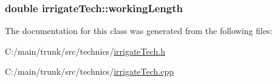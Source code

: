 \label{classirrigate_tech_a52efb2478036767847d634779f039c9d}
\hypertarget{classirrigate_tech_ada1989252be32c06c3f61e5413012efd}{
\subsubsection[{workingLength}]{\setlength{\rightskip}{0pt plus 5cm}double {\bf irrigateTech::workingLength}}}
\label{classirrigate_tech_ada1989252be32c06c3f61e5413012efd}


The documentation for this class was generated from the following files:\begin{DoxyCompactItemize}
\item 
C:/main/trunk/src/technics/\hyperlink{irrigate_tech_8h}{irrigateTech.h}\item 
C:/main/trunk/src/technics/\hyperlink{irrigate_tech_8cpp}{irrigateTech.cpp}\end{DoxyCompactItemize}
